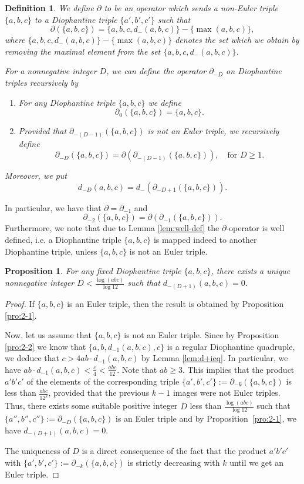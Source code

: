 \documentclass{amsart}
\newtheorem{proposition}{Proposition}
\newtheorem*{definition}{Definition}
\theoremstyle{definition}
\begin{document}
\begin{definition}
We define $\partial$ to be an operator which sends a non-Euler triple $\{a,b,c\}$ to 
a Diophantine triple $\{a',b',c'\}$ such that
$$
\partial(\{a,b,c\}) = \{a,b,c,d_{-}(a,b,c)\} - \{\max(a,b,c)\},
$$
where $\{a,b,c,d_{-}(a,b,c)\} - \{\max(a,b,c)\}$ denotes the set which we obtain by removing the maximal element from the set  $\{a,b,c,d_{-}(a,b,c)\}$.

For a nonnegative integer $D$, we can define the operator $\partial_{-D}$ on Diophantine triples recursively by
\begin{enumerate}
\item For any Diophantine triple $\{a,b,c\}$ we define
$$
\partial _{0}(\{a,b,c\}) =\{a,b,c\}. 
$$

\item Provided that $\partial_{-(D-1)}(\{a,b,c\})$ is not an Euler triple, we recursively define
$$
\partial_{-D}(\{a,b,c\}) =\partial\left(\partial_{-(D-1)}(\{a,b,c\})\right),\quad \mbox{for}\,\, D\ge 1. 
$$ 
\end{enumerate}

Moreover, we put
$$
d_{-D}(a,b,c)=d_{-}(\partial_{-D+1}(\{a,b,c\})).
$$
\end{definition} 

In particular, we have that $\partial=\partial_{-1}$ and
$$
\partial_{-2}(\{a,b,c\}) =\partial\left(\partial_{-1}(\{a,b,c\})\right).
$$
Furthermore, we note that due to Lemma \ref{lem:well-def} the $\partial$-operator is well defined, i.e. a Diophantine triple $\{a,b,c\}$ is mapped indeed to another Diophantine triple,
unless $\{a,b,c\}$ is not an Euler triple.

\begin{proposition}\label{pro:2-3}
For any fixed Diophantine triple $\{a,b,c\}$, there exists a unique nonnegative integer $D<\frac{\log (abc)}{ \log 12}$ such that $d_{-(D+1)}(a,b,c)=0$. 
\end{proposition}

\begin{proof}
If $\{a,b,c\}$ is an Euler triple, then the result is obtained by Proposition \ref{pro:2-1}. 

Now, let us assume that $\{a,b,c\}$ is not an Euler triple. Since by Proposition \ref{pro:2-2} we know that $\{a,b,d_{-1}(a,b,c),c\}$
is a regular Diophantine quadruple, we deduce that $c>4ab\cdot d_{-1}(a,b,c)$ by Lemma \ref{lem:d+ieq}. In particular, we have 
$ab\cdot d_{-1}(a,b,c)<\frac{c}{4}<\frac{abc}{12}$. Note that $ab\geq 3$. This implies that the product $a'b'c'$ of the elements of the corresponding
triple $\{a',b',c'\}:=\partial_{-k}(\{a,b,c\})$ is less than $\frac{abc}{12^{k}}$, provided that the previous $k-1$ images were
not Euler triples. Thus, there exists some suitable positive integer $D$ less than $\frac{\log(abc)}{\log 12}$ such that
$\{a'',b'',c''\}:=\partial_{-D}(\{a,b,c\})$ is an Euler triple and by Proposition~\ref{pro:2-1}, we have $d_{-(D+1)}(a,b,c)=0$.

The uniqueness of $D$ is a direct consequence of the fact that the product $a'b'c'$ with $\{a',b',c'\}:=\partial_{-k}(\{a,b,c\})$ is strictly decreasing with $k$ until we get an Euler triple.
\end{proof}
\end{document}

